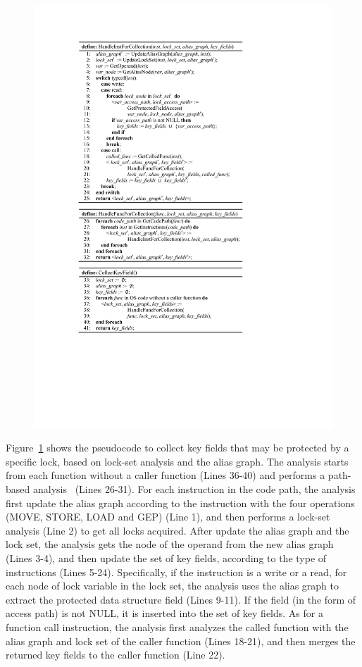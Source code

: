 \begin{figure}[htbp]
	\centering
	\includegraphics[width=1\linewidth]{figures/fig_pseudocode_field_extract.pdf}
	\label{fig_pseudocode_field_extract}
\end{figure}

Figure~\ref{fig_pseudocode_field_extract} shows the pseudocode to collect key 
fields that may be protected by a specific lock, based on lock-set analysis and 
the alias graph. The analysis starts from each function without a caller 
function (Lines 36-40) and performs a path-based analysis~\cite{Li:ASPLOS22} 
(Lines 26-31). For each instruction in the code path, the analysis first update 
the alias graph according to the instruction with the four operations (MOVE, 
STORE, LOAD and GEP) (Line 1), and then performs a lock-set analysis (Line 2) 
to get all locks acquired. After update the alias graph and the lock set, the 
analysis gets the node of the operand from the new alias graph (Lines 3-4), and 
then update the set of key fields, according to the type of instructions (Lines 
5-24). Specifically, if the instruction is a write or a read, for each node of 
lock variable in the lock set, the analysis uses the alias graph to extract the 
protected data structure field (Lines 9-11). If the field (in the form of 
access path) is not NULL, it is inserted into the set of key fields. As for a 
function call instruction, the analysis first analyzes the called function with 
the alias graph and lock set of the caller function (Lines 18-21), and then 
merges the returned key fields to the caller function (Line 22).


